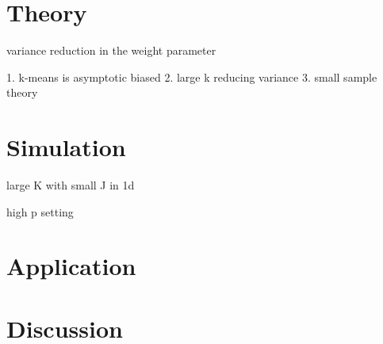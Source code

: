 \documentclass[12pt]{article}
\begin{document}
\section{Theory}

variance reduction in the weight parameter

1. k-means is asymptotic biased
2. large k reducing variance
3. small sample theory


\section{Simulation}

large K with small J in 1d

high p setting


\section{Application}
\section{Discussion}



\end{document}
